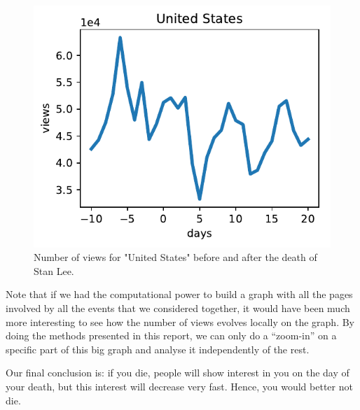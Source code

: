 \documentclass[conference]{IEEEtran}
\begin{document}
\begin{figure}[!htb]
\includegraphics[width=\linewidth]{UnitedStates.pdf}
\caption{Number of views for "United States" before and after the death of Stan Lee.} 
\end{figure}

Note that if we had the computational power to build a graph with all the pages involved by all the events that we considered together, it would have been much more interesting to see how the number of views evolves locally on the graph. By doing the methods presented in this report, we can only do a “zoom-in” on a specific part of this big graph and analyse it independently of the rest. 

\medskip

Our final conclusion is: if you die, people will show interest in you on the day of your death, but this interest will decrease very fast. Hence, you would better not die. 




\end{document}
